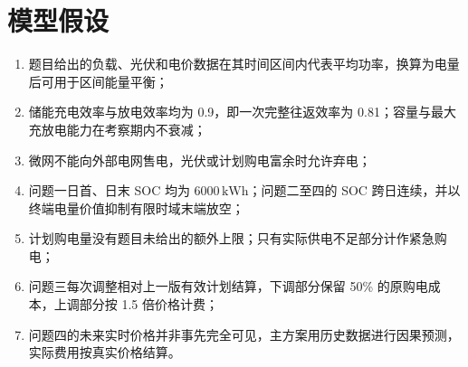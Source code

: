 \section{模型假设}

\begin{enumerate}
  \item 题目给出的负载、光伏和电价数据在其时间区间内代表平均功率，换算为电量后可用于区间能量平衡；
  \item 储能充电效率与放电效率均为 0.9，即一次完整往返效率为 0.81；容量与最大充放电能力在考察期内不衰减；
  \item 微网不能向外部电网售电，光伏或计划购电富余时允许弃电；
  \item 问题一日首、日末 SOC 均为 $6000\,\mathrm{kWh}$；问题二至四的 SOC 跨日连续，并以终端电量价值抑制有限时域末端放空；
  \item 计划购电量没有题目未给出的额外上限；只有实际供电不足部分计作紧急购电；
  \item 问题三每次调整相对上一版有效计划结算，下调部分保留 50\% 的原购电成本，上调部分按 1.5 倍价格计费；
  \item 问题四的未来实时价格并非事先完全可见，主方案用历史数据进行因果预测，实际费用按真实价格结算。
\end{enumerate}
